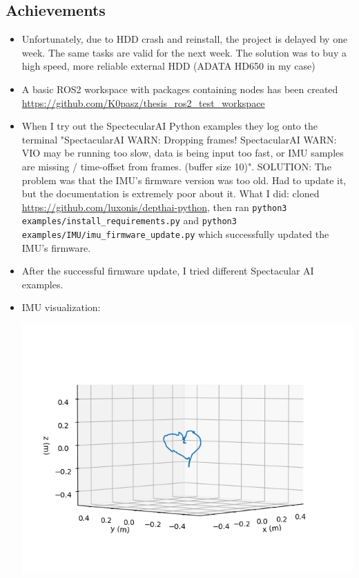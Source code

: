 \documentclass{article}
\begin{document}
\subsection{Achievements}
\begin{itemize}
    \item Unfortunately, due to HDD crash and reinstall, the project is delayed by one week. The same tasks are valid for the next week. The solution was to buy a high speed, more reliable external HDD (ADATA HD650 in my case)
    \item A basic ROS2 workspace with packages containing nodes has been created \url{https://github.com/K0pasz/thesis_ros2_test_workspace}
    \item When I try out the SpectecularAI Python examples they log onto the terminal "SpectacularAI WARN: Dropping frames!
SpectacularAI WARN:   VIO may be running too slow, data is being input too fast, or IMU samples are missing / time-offset from frames. (buffer size 10)". SOLUTION: The problem was that the IMU's firmware version was too old. Had to update it, but the documentation is extremely poor about it. What I did: cloned \url{https://github.com/luxonis/depthai-python}, then ran \verb|python3 examples/install_requirements.py| and \verb|python3 examples/IMU/imu_firmware_update.py| which successfully updated the IMU's firmware.
    \item After the successful firmware update, I tried different Spectacular AI examples.
    \item IMU visualization:\par
    \begin{minipage}{\linewidth}
        \centering
        \includegraphics[width=1\linewidth]{spectacular_ai_vio_visu.png}
    \end{minipage}

    
\end{itemize}
\end{document}
